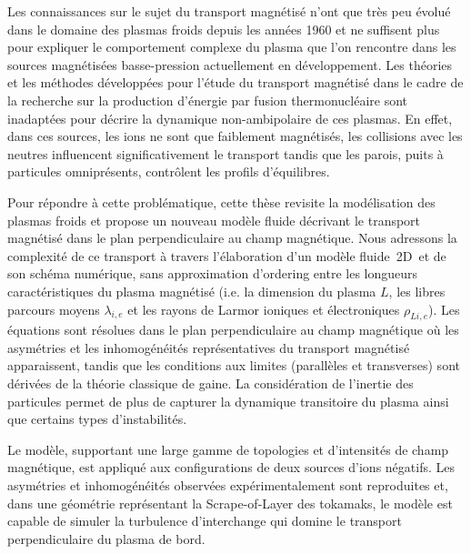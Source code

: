 \ChapterStar{}
	\thispagestyle{empty}
\vspace{90pt}
Les connaissances sur le sujet du transport magnétisé n'ont que très peu évolué
dans le domaine des plasmas froids depuis les années 1960 et ne suffisent plus
pour expliquer le comportement complexe du plasma que l'on
rencontre dans les sources magnétisées basse-pression actuellement en développement.
Les théories et les méthodes développées pour l'étude du transport magnétisé
dans le cadre de la recherche sur la production d'énergie par fusion
thermonucléaire sont inadaptées pour décrire la dynamique non-ambipolaire de ces
plasmas. En effet, dans ces sources, les ions ne sont que faiblement magnétisés,
les collisions avec les neutres influencent significativement le transport
tandis que les parois, puits à particules omniprésents, contrôlent les profils
d'équilibres.

Pour répondre à cette problématique, cette thèse revisite la modélisation
des plasmas froids et propose un nouveau modèle fluide décrivant le transport
magnétisé dans le plan perpendiculaire au champ magnétique.		
Nous adressons la complexité de ce transport à travers l’élaboration d'un modèle
fluide~2D\textonehalf ~et de son schéma numérique, sans approximation d'ordering
entre les longueurs caractéristiques du plasma magnétisé (i.e. la dimension du
plasma $L$, les libres parcours moyens $\lambda_{i,e}$ et les rayons
de Larmor ioniques et électroniques $\rho_{Li,e}$).
Les équations sont résolues dans le plan perpendiculaire au champ magnétique où
les asymétries et les inhomogénéités représentatives du transport magnétisé
apparaissent, tandis que les conditions aux limites (parallèles et transverses)
sont dérivées de la théorie classique de gaine. La considération de l'inertie
des particules permet de plus de capturer la dynamique transitoire du plasma
ainsi que certains types d'instabilités.
		
Le modèle, supportant une large gamme de topologies et d'intensités de champ
magnétique, est appliqué aux configurations de deux sources d'ions négatifs. 
Les asymétries et inhomogénéités observées expérimentalement sont reproduites
et, dans une géométrie représentant la Scrape-of-Layer des tokamaks, le modèle
est capable de simuler la turbulence d'interchange qui domine le transport
perpendiculaire du plasma de bord.	
